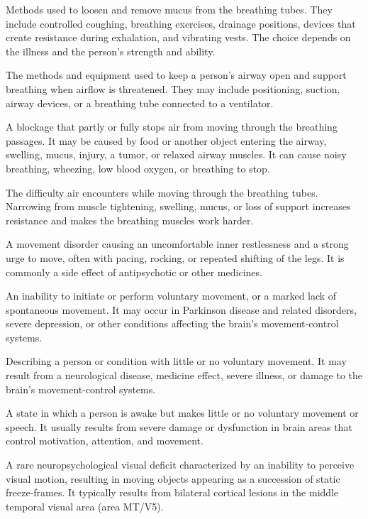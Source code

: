  Methods used to loosen and remove mucus from the breathing tubes. They include controlled coughing, breathing exercises, drainage positions, devices that create resistance during exhalation, and vibrating vests. The choice depends on the illness and the person’s strength and ability.

 The methods and equipment used to keep a person’s airway open and support breathing when airflow is threatened. They may include positioning, suction, airway devices, or a breathing tube connected to a ventilator.

 A blockage that partly or fully stops air from moving through the breathing passages. It may be caused by food or another object entering the airway, swelling, mucus, injury, a tumor, or relaxed airway muscles. It can cause noisy breathing, wheezing, low blood oxygen, or breathing to stop.

 The difficulty air encounters while moving through the breathing tubes. Narrowing from muscle tightening, swelling, mucus, or loss of support increases resistance and makes the breathing muscles work harder.

 A movement disorder causing an uncomfortable inner restlessness and a strong urge to move, often with pacing, rocking, or repeated shifting of the legs. It is commonly a side effect of antipsychotic or other medicines.

 An inability to initiate or perform voluntary movement, or a marked lack of spontaneous movement. It may occur in Parkinson disease and related disorders, severe depression, or other conditions affecting the brain’s movement-control systems.

 Describing a person or condition with little or no voluntary movement. It may result from a neurological disease, medicine effect, severe illness, or damage to the brain’s movement-control systems.

 A state in which a person is awake but makes little or no voluntary movement or speech. It usually results from severe damage or dysfunction in brain areas that control motivation, attention, and movement.

 A rare neuropsychological visual deficit characterized by an inability to perceive visual motion, resulting in moving objects appearing as a succession of static freeze-frames. It typically results from bilateral cortical lesions in the middle temporal visual area (area MT/V5).

